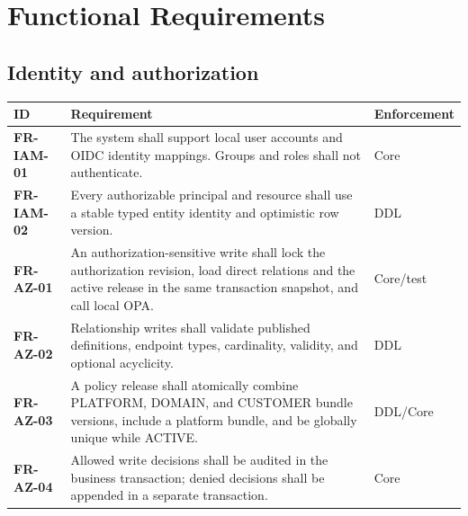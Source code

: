 \documentclass[journal,a4paper,onecolumn]{IEEEtran}
\newcommand{\req}[1]{\textbf{#1}}
\begin{document}
\section{Functional Requirements}
\subsection{Identity and authorization}
\begin{longtable}{p{}p{}p{}}
\toprule
ID & Requirement & Enforcement \\
\midrule
\endhead
\req{FR-IAM-01} & The system shall support local user accounts and OIDC identity mappings. Groups and roles shall not authenticate. & Core\\
\req{FR-IAM-02} & Every authorizable principal and resource shall use a stable typed entity identity and optimistic row version. & DDL\\
\req{FR-AZ-01} & An authorization-sensitive write shall lock the authorization revision, load direct relations and the active release in the same transaction snapshot, and call local OPA. & Core/test\\
\req{FR-AZ-02} & Relationship writes shall validate published definitions, endpoint types, cardinality, validity, and optional acyclicity. & DDL\\
\req{FR-AZ-03} & A policy release shall atomically combine PLATFORM, DOMAIN, and CUSTOMER bundle versions, include a platform bundle, and be globally unique while ACTIVE. & DDL/Core\\
\req{FR-AZ-04} & Allowed write decisions shall be audited in the business transaction; denied decisions shall be appended in a separate transaction. & Core\\
\bottomrule
\end{longtable}
\end{document}
